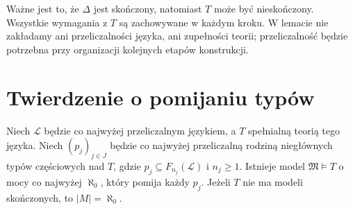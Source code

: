 Ważne jest to, że $\Delta$ jest skończony, natomiast
$T$ może być nieskończony. Wszystkie wymagania z $T$
są zachowywane w każdym kroku. W lemacie nie
zakładamy ani przeliczalności języka, ani zupełności
teorii; przeliczalność będzie potrzebna przy
organizacji kolejnych etapów konstrukcji.

\section{Twierdzenie o pomijaniu typów}
\begin{twierdzenie}
\label{thm:mod-ott}
Niech $\mathcal L$ będzie co najwyżej przeliczalnym
językiem, a $T$ spełnialną teorią tego języka.
Niech $(p_j)_{j\in J}$ będzie co najwyżej przeliczalną
rodziną niegłównych typów częściowych nad $T$,
gdzie $p_j\subseteq F_{n_j}(\mathcal L)$ i $n_j\geq1$.
Istnieje model $\mathfrak M\models T$ o mocy
co najwyżej $\aleph_0$, który pomija każdy $p_j$.
Jeżeli $T$ nie ma modeli skończonych, to
$|M|=\aleph_0$.
\end{twierdzenie}
